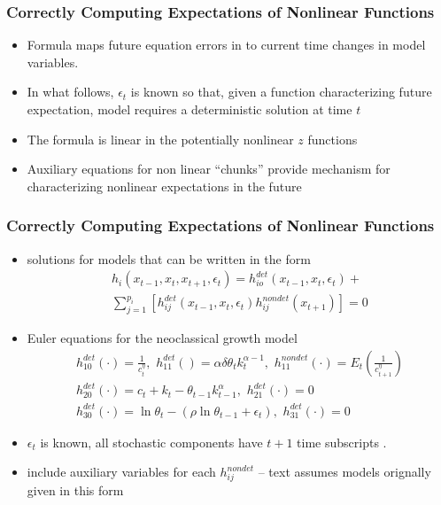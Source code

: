 \documentclass[letter]{beamer}
\begin{document}
\begin{frame}
  \frametitle{Correctly Computing Expectations of Nonlinear Functions}

  \begin{itemize}
  \item Formula maps future equation errors in to current time changes in model
variables.
\item In what follows, $\epsilon_t$ is known so that,
given a function characterizing future expectation,  model requires
a deterministic solution at time $t$
\item The formula is linear in the potentially nonlinear $z$ functions
\item Auxiliary equations for non linear ``chunks'' provide mechanism for characterizing  nonlinear expectations in the future
  \end{itemize}
\end{frame}


\begin{frame}
  \frametitle{Correctly Computing Expectations of Nonlinear Functions}
{\small 
  \begin{itemize}
  \item solutions for models that can be written in  the form
\begin{gather}
  h_i(x_{t-1},x_{t},x_{t+1},\epsilon_t)=h^{det}_{io}(x_{t-1},x_{t},\epsilon_t)+\\ 
\sum_{j=1}^{p_i} [h^{det}_{ij}(x_{t-1},x_{t},\epsilon_t)h^{nondet}_{ij}(x_{t+1})]=0
\end{gather}
\item Euler equations for the  neoclassical growth  model 
\label{sec:simple-rbc-model-ext} 
\begin{gather}
h_{10}^{det}(\cdot)=\frac{1}{c_t^\eta},\,\,
h_{11}^{det}()=\alpha \delta \theta_{t}k_{t}^{\alpha-1} ,\,\,
h_{11}^{nondet}(\cdot)=E_t \left (\frac{1}{c_{t+1}^\eta} \right )\\
h_{20}^{det}(\cdot)=c_t + k_t-\theta_{t-1}k_{t-1}^\alpha,\,\,
h_{21}^{det}(\cdot)=0\\
h_{30}^{det}(\cdot)=\ln \theta_t -(\rho \ln \theta_{t-1} + \epsilon_t),\,\,
h_{31}^{det}(\cdot)=0
\end{gather}
\item $\epsilon_t$ is known, all stochastic components have $t+1$ time subscripts . 
\item include auxiliary variables for each $h_{ij}^{nondet}$  -- text assumes models orignally given in this form
  \end{itemize}




}
\end{frame}
\end{document}
